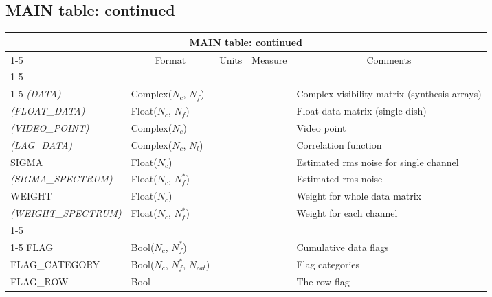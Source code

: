 \documentclass{article}
\newcommand{\nc}{$N_c$}
\newcommand{\nf}{$N_f$}
\newcommand{\nfs}{$N_f^*$}
\newcommand{\nl}{$N_l$}
\newcommand{\ncat}{$N_{cat}$}
\newcommand{\defline}[1]{\cline{1-5}
\multicolumn{5}{|l|}{#1} \\
\cline{1-5}}
\newcommand{\definetable}[2]
{
	\vfill\newpage
	\subsection{#1}
        \vspace{0.15in}
        \small
	\begin{tabular}{|l|p{1.25in}|l|p{.9in}|p{1.4in}|}
	\hline
	\multicolumn{5}{|c|}{\bf #1}\\ 
	\cline{1-5}
        \multicolumn{1}{|c|}{Name}&\multicolumn{1}{|c|}{Format}&
        \multicolumn{1}{|c|}{Units}&\multicolumn{1}{|c|}{Measure}&
        \multicolumn{1}{|c|}{Comments}\\
        \cline{1-5}
        #2
        \hline
	\end{tabular}
}
\begin{document}
\definetable{MAIN table: continued}
{
\defline{\em Data}
{\it (DATA)}    &    Complex(\nc, \nf) &  & & Complex visibility
matrix (synthesis arrays)\\
{\it (FLOAT\_DATA)} & Float(\nc, \nf) & & & Float data matrix
(single dish) \\
{\it (VIDEO\_POINT)} & Complex(\nc) & & & Video point \\
{\it (LAG\_DATA)} & Complex(\nc, \nl) & & & Correlation function \\
SIGMA   &    Float(\nc) &  & & Estimated rms noise for single channel \\ 
{\it (SIGMA\_SPECTRUM)}   &    Float(\nc, \nfs) &  & & Estimated rms noise \\ 
WEIGHT   &    Float(\nc) &  & & Weight for whole data matrix \\ 
{\it (WEIGHT\_SPECTRUM)}   &    Float(\nc, \nfs) &  & & Weight for each channel\\ 
\defline{\em Flag information}
FLAG    &    Bool(\nc, \nfs) &  &   &  Cumulative data flags \\ 
FLAG\_CATEGORY & Bool(\nc, \nfs, \ncat) & & & Flag categories \\
FLAG\_ROW &    Bool  &  &   &  The row flag \\ 
}
\end{document}
